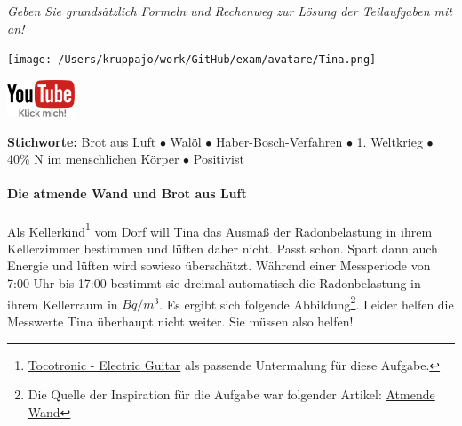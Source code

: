 \documentclass[a4paper, 9pt]{scrartcl}\usepackage[]{graphicx}\usepackage[]{xcolor}
\begin{document}
\textit{Geben Sie grundsätzlich Formeln und Rechenweg zur Lösung der Teilaufgaben mit an!} \\[1Ex]
 

 
\ifcollection
\begin{flushright}
\tiny\vspace{-3Ex}
\textbf{\examinhaltstart}
\exammodulemathstat
\vspace{-4Ex}
\end{flushright}
\begin{minipage}[t]{0.5\textwidth}
\texttt{[image: /Users/kruppajo/work/GitHub/exam/avatare/Tina.png]}
\end{minipage}
\begin{minipage}[t]{0.5\textwidth}
\hfill
\href{https://youtu.be/4-dSaPMhK9s}{\includegraphics[width = 2cm]{img/youtube}}
\end{minipage}
\fi

{\tiny\textbf{Stichworte:} Brot aus Luft $\bullet$ Walöl $\bullet$ Haber-Bosch-Verfahren $\bullet$ 1. Weltkrieg $\bullet$ 40\% N im menschlichen Körper $\bullet$ Positivist}



\ifcollection
\paragraph{Die atmende Wand und Brot aus Luft}
\fi



Als Kellerkind\footnote{\href{https://www.youtube.com/watch?v=54H0HAJexVI}{Tocotronic - Electric Guitar} als passende Untermalung für diese Aufgabe.} vom Dorf will Tina das Ausmaß der Radonbelastung in ihrem Kellerzimmer bestimmen und lüften daher nicht. Passt schon. Spart dann auch Energie und lüften wird sowieso überschätzt. Während einer Messperiode von 7:00 Uhr bis 17:00 bestimmt sie dreimal automatisch die Radonbelastung in ihrem Kellerraum in $Bq/m^3$. Es ergibt sich folgende Abbildung\footnote{Die Quelle der Inspiration für die Aufgabe war folgender Artikel: \href{https://de.wikipedia.org/wiki/Atmende_Wand}{Atmende Wand}}. Leider helfen die Messwerte Tina überhaupt nicht weiter. Sie müssen also helfen! 
\end{document}
